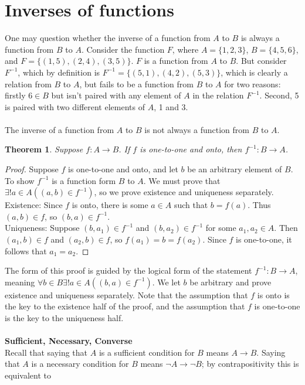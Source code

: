 \documentclass{report}
\newtheorem*{theorem}{Theorem}
\theoremstyle{definition}
\begin{document}
\section{Inverses of functions}
One may question whether the inverse of a function from $A$ to $B$ is always a function from $B$ to $A$. Consider the function $F$, where $A=\{1,2,3\}$, $B=\{4,5,6\}$, and $F=\{(1,5),(2,4),(3,5)\}$.
$F$ is a function from $A$ to $B$. But consider $F^{-1}$, which by definition is $F^{-1}=\{(5,1),(4,2),(5,3)\}$, which is clearly a relation from $B$ to $A$, but fails to be a function from $B$ 
to $A$ for two reasons: firstly $6\in B$ but isn't paired with any element of $A$ in the relation $F^{-1}$. Second, 5 is paired with two different elements of $A$, 1 and 3.\\
\vspace{1mm}\\
The inverse of a function from $A$ to $B$ is not always a function from $B$ to $A$.
\begin{theorem}
Suppose $f:A\to B$. If $f$ is one-to-one and onto, then $f^{-1}:B\to A$.
\end{theorem}
\begin{proof}
Suppose $f$ is one-to-one and onto, and let $b$ be an arbitrary element of $B$. To show $f^{-1}$ is a function form $B$ to $A$. We must prove that $\exists!a\in A((a,b)\in f^{-1})$, so we
prove existence and uniqueness separately.\\
\indent Existence: Since $f$ is onto, there is some $a\in A$ such that $b=f(a)$. Thus $(a,b)\in f$, so $(b,a)\in f^{-1}$.\\
\indent Uniqueness: Suppose $(b,a_1)\in f^{-1}$ and $(b,a_2)\in f^{-1}$ for some $a_1,a_2\in A$. Then $(a_1,b)\in f$ and $(a_2,b)\in f$, so $f(a_1)=b=f(a_2)$. Since $f$ is one-to-one, it follows that $a_1=a_2$.
\end{proof}
\noindent The form of this proof is guided by the logical form of the statement $f^{-1}:B\to A$, meaning $\forall b\in B\exists!a\in A((b,a)\in f^{-1})$. We let $b$ be arbitrary and prove existence
and uniqueness separately. Note that the assumption that $f$ is onto is the key to the existence half of the proof, and the assumption that $f$ is one-to-one is the key to the uniqueness half.\\
\vspace{1mm}\\
\textbf{Sufficient, Necessary, Converse}\\
Recall that saying that $A$ is a sufficient condition for $B$ means $A\to B$. Saying that $A$ is a necessary condition for $B$ means $\neg A\to\neg B$; by contrapositivity this is equivalent to 
\end{document}
